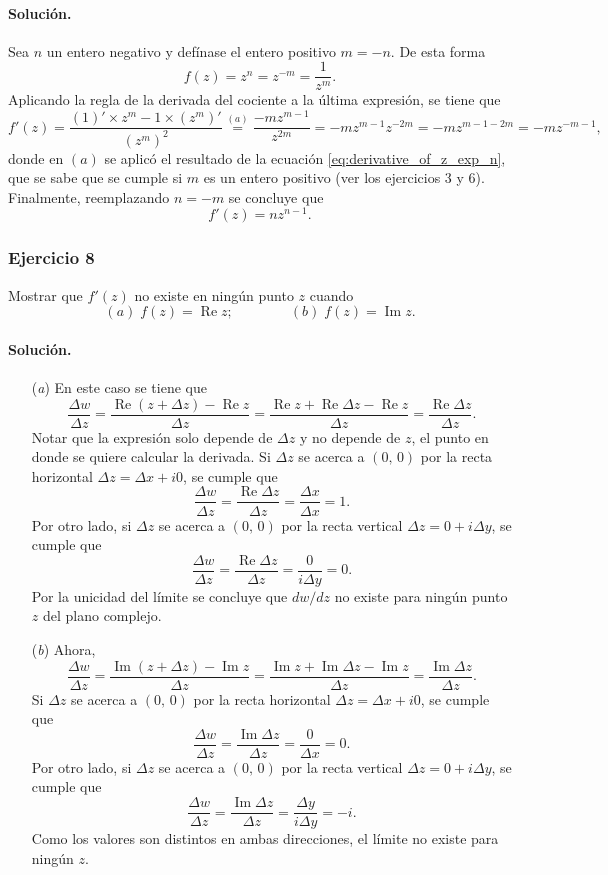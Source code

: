 \documentclass[a4paper]{report}
\renewcommand{\Re}{\operatorname{Re}}
\renewcommand{\Im}{\operatorname{Im}}
\begin{document}
\paragraph{Solución.} Sea \(n\) un entero negativo y defínase el entero positivo \(m=-n\). De esta forma
\[
 f(z)=z^n=z^{-m}=\frac{1}{z^m}.
\]
Aplicando la regla de la derivada del cociente a la última expresión, se tiene que 
\[
 f'(z)=\frac{(1)'\times z^m-1\times(z^m)'}{(z^m)^2}
  \overset{(a)}{=}\frac{-mz^{m-1}}{z^{2m}}=-mz^{m-1}z^{-2m}=-mz^{m-1-2m}=-mz^{-m-1},
\]
donde en \((a)\) se aplicó el resultado de la ecuación \ref{eq:derivative_of_z_exp_n}, que se sabe que se cumple si \(m\) es un entero positivo (ver los ejercicios 3 y 6). Finalmente, reemplazando \(n=-m\) se concluye que 
\[
 f'(z)=nz^{n-1}.
\]

\subsubsection{Ejercicio 8}

Mostrar que \(f'(z)\) no existe en ningún punto \(z\) cuando 
\[
 (\textit{a})\;f(z)=\Re z;\qquad\qquad
 (\textit{b})\;f(z)=\Im z.
\]

\paragraph{Solución.}  

\begin{enumerate}
 \item[(\textit{a})] En este caso se tiene que 
 \[
  \frac{\Delta w}{\Delta z}=\frac{\Re(z+\Delta z)-\Re z}{\Delta z}=\frac{\Re z+\Re\Delta z-\Re z}{\Delta z}=\frac{\Re\Delta z}{\Delta z}.
 \]
 Notar que la expresión solo depende de \(\Delta z\) y no depende de \(z\), el punto en donde se quiere calcular la derivada. Si \(\Delta z\) se acerca a \((0,\,0)\) por la recta horizontal \(\Delta z=\Delta x+i0\), se cumple que
 \[
  \frac{\Delta w}{\Delta z}=\frac{\Re\Delta z}{\Delta z}=\frac{\Delta x}{\Delta x}=1.
 \]
 Por otro lado, si \(\Delta z\) se acerca a \((0,\,0)\) por la recta vertical \(\Delta z=0+i\Delta y\), se cumple que 
 \[
  \frac{\Delta w}{\Delta z}=\frac{\Re\Delta z}{\Delta z}=\frac{0}{i\Delta y}=0.
 \]
 Por la unicidad del límite se concluye que \(dw/dz\) no existe para ningún punto \(z\) del plano complejo.
 \item[(\textit{b})] Ahora,
 \[
  \frac{\Delta w}{\Delta z}=\frac{\Im(z+\Delta z)-\Im z}{\Delta z}=\frac{\Im z+\Im\Delta z-\Im z}{\Delta z}=\frac{\Im\Delta z}{\Delta z}.
 \]
 Si \(\Delta z\) se acerca a \((0,\,0)\) por la recta horizontal \(\Delta z=\Delta x+i0\), se cumple que
 \[
  \frac{\Delta w}{\Delta z}=\frac{\Im\Delta z}{\Delta z}=\frac{0}{\Delta x}=0.
 \]
 Por otro lado, si \(\Delta z\) se acerca a \((0,\,0)\) por la recta vertical \(\Delta z=0+i\Delta y\), se cumple que 
 \[
  \frac{\Delta w}{\Delta z}=\frac{\Im\Delta z}{\Delta z}=\frac{\Delta y}{i\Delta y}=-i.
 \]
 Como los valores son distintos en ambas direcciones, el límite no existe para ningún \(z\).
\end{enumerate} 
 
\end{document}
